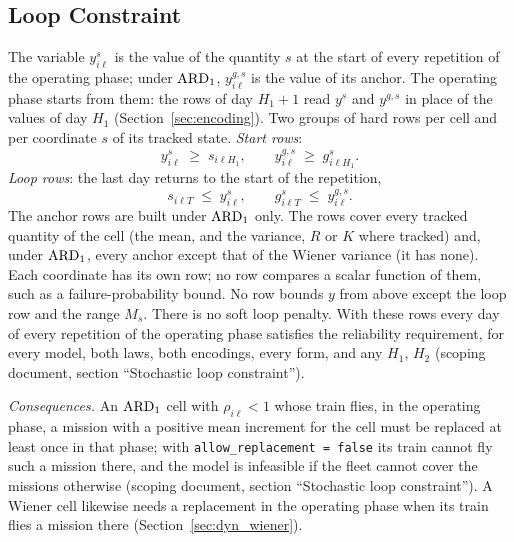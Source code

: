 \subsection{Loop Constraint}
\label{sec:loop}

The variable $y^s_{i\ell}$ is the value of the quantity $s$ at the start of every
repetition of the operating phase; under $\mathrm{ARD}_{1}$, $y^{g,s}_{i\ell}$ is the value of
its anchor. The operating phase starts from them: the rows of day $H_1 + 1$ read
$y^s$ and $y^{g,s}$ in place of the values of day $H_1$ (Section~\ref{sec:encoding}).
Two groups of hard rows per cell and per coordinate $s$ of its tracked state.
\emph{Start rows}:
\begin{equation}
  y^s_{i\ell} \;\geq\; s_{i\ell H_1}, \qquad
  y^{g,s}_{i\ell} \;\geq\; g^s_{i\ell H_1}.
  \label{eq:a_start}
\end{equation}
\emph{Loop rows}: the last day returns to the start of the repetition,
\begin{equation}
  s_{i\ell T} \;\leq\; y^s_{i\ell}, \qquad
  g^s_{i\ell T} \;\leq\; y^{g,s}_{i\ell}.
  \label{eq:a_loop}
\end{equation}
The anchor rows are built under $\mathrm{ARD}_{1}$ only. The rows cover every tracked quantity of
the cell (the mean, and the variance, $R$ or $K$ where tracked) and, under $\mathrm{ARD}_{1}$,
every anchor except that of the Wiener variance (it has none). Each coordinate has its own
row; no row compares a scalar function of them, such as a failure-probability bound.
No row bounds $y$ from above except the loop row and the range $M_s$.
There is no soft loop penalty. With these rows every day of every repetition of the
operating phase satisfies the reliability requirement, for every model, both laws,
both encodings, every form, and any $H_1$, $H_2$ (scoping document, section
``Stochastic loop constraint'').

\emph{Consequences.} An $\mathrm{ARD}_{1}$ cell with $\rho_{i\ell} < 1$ whose train flies, in the
operating phase, a mission with a positive mean increment for the cell must be
replaced at least once in that phase; with \texttt{allow\_replacement = false} its
train cannot fly such a mission there, and the model is infeasible if the fleet
cannot cover the missions otherwise (scoping document, section ``Stochastic loop
constraint''). A Wiener cell likewise needs a replacement in the operating phase
when its train flies a mission there (Section~\ref{sec:dyn_wiener}).
